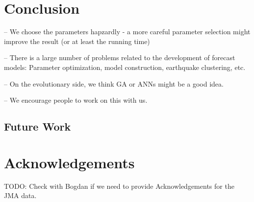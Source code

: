 \documentclass{sig-alternate}
\begin{document}
\section{Conclusion}


-- We choose the parameters hapzardly - a more careful parameter
selection might improve the result (or at least the running time)


-- There is a large number of problems related to the development of
forecast models: Parameter optimization, model construction,
earthquake clustering, etc.

-- On the evolutionary side, we think GA or ANNs might be a good idea.

-- We encourage people to work on this with us.

\subsection{Future Work}




\section*{Acknowledgements}

TODO: Check with Bogdan if we need to provide Acknowledgements for the
JMA data.




\end{document}
